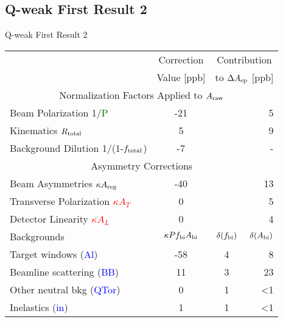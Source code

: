 \documentclass[xcolor=x11names,compress,8pt]{beamer}
\renewcommand{\(}{\begin{columns}}
\renewcommand{\)}{\end{columns}}
\newcommand{\<}[1]{\begin{column}{#1}}
\renewcommand{\>}{\end{column}}
\begin{document}
\subsection{Q-weak First Result 2}
\begin{frame}{Q-weak First Result 2}


\begin{table}[th]
\centering
\begin{tabular}{@{} l @{}|@{} c @{} c  r }
\hline
 & Correction & \multicolumn{2}{c}{Contribution} \\
  & Value [ppb] & \multicolumn{2}{c}{to $\Delta A_{\rm ep}$ [ppb]} \\ 
  \hline 
  \multicolumn{4}{c}{Normalization Factors Applied to \textcolor{red}{$A_{\rm raw}$} } \\ 
  \hline 
Beam Polarization 1/\textcolor{darkgreen}{P} & -21 & \multicolumn{2}{r}{5} \\
Kinematics \textcolor{magenta}{$R_{\rm total}$} & 5 & \multicolumn{2}{r}{9} \\ 
Background Dilution 1/(1-\textcolor{blue}{$f_{\rm total}$}) & -7 & \multicolumn{2}{r}{-} \\ 
\hline
\multicolumn{4}{c}{Asymmetry Corrections} \\
\hline  
Beam Asymmetries \textcolor{red}{$\kappa A_{\rm reg}$} & -40 & \multicolumn{2}{r}{13} \\ 
Transverse Polarization \textcolor{red}{$\kappa A_{T}$} & 0 & \multicolumn{2}{r}{5} \\ 
Detector Linearity \textcolor{red}{$\kappa A_{L}$} & 0 & \multicolumn{2}{r}{4} \\ 
\hline
Backgrounds  & \textcolor{blue}{$\kappa Pf_{\rm bi}A_{\rm bi}$} & \textcolor{blue}{$\delta(f_{\rm bi})$} & \textcolor{blue}{$\delta(A_{\rm bi})$} \\ 
\hline 
\hspace{0.1cm} Target windows (\textcolor{blue}{\rm Al}) & -58 & 4 & 8 \\ 
\hspace{0.1cm} Beamline scattering (\textcolor{blue}{\rm BB}) & 11 & 3 & 23 \\ 
\hspace{0.1cm} Other neutral bkg (\textcolor{blue}{\rm QTor}) & 0 & 1 & \textless 1 \\ 
\hspace{0.1cm} Inelastics (\textcolor{blue}{\rm in}) & 1 & 1 & \textless 1 \\ 
\hline


\end{tabular}
\end{table}
\end{frame}
\end{document}
